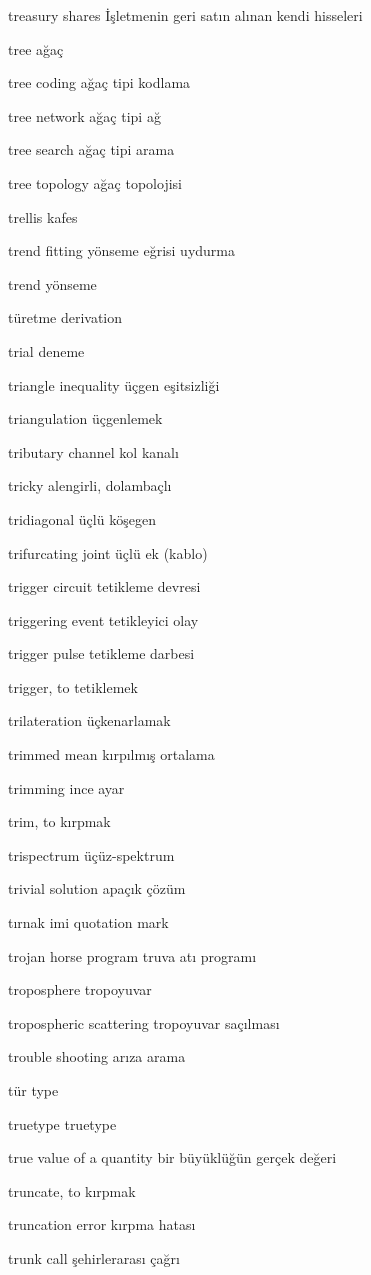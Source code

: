 \documentclass[12pt,fleqn]{article}\usepackage{../../common}
\begin{document}
treasury shares İşletmenin geri satın alınan kendi hisseleri

tree ağaç

tree coding ağaç tipi kodlama

tree network ağaç tipi ağ

tree search ağaç tipi arama

tree topology ağaç topolojisi

trellis kafes

trend fitting yönseme eğrisi uydurma

trend yönseme

türetme derivation

trial deneme

triangle inequality üçgen eşitsizliği

triangulation üçgenlemek

tributary channel kol kanalı

tricky alengirli, dolambaçlı

tridiagonal üçlü köşegen

trifurcating joint üçlü ek (kablo)

trigger circuit tetikleme devresi

triggering event tetikleyici olay

trigger pulse tetikleme darbesi

trigger, to tetiklemek

trilateration üçkenarlamak

trimmed mean kırpılmış ortalama

trimming ince ayar

trim, to kırpmak

trispectrum üçüz-spektrum

trivial solution apaçık çözüm

tırnak imi quotation mark

trojan horse program truva atı programı

troposphere tropoyuvar

tropospheric scattering tropoyuvar saçılması

trouble shooting arıza arama

tür type

truetype truetype

true value of a quantity bir büyüklüğün gerçek değeri

truncate, to kırpmak

truncation error kırpma hatası

trunk call şehirlerarası çağrı
\end{document}
